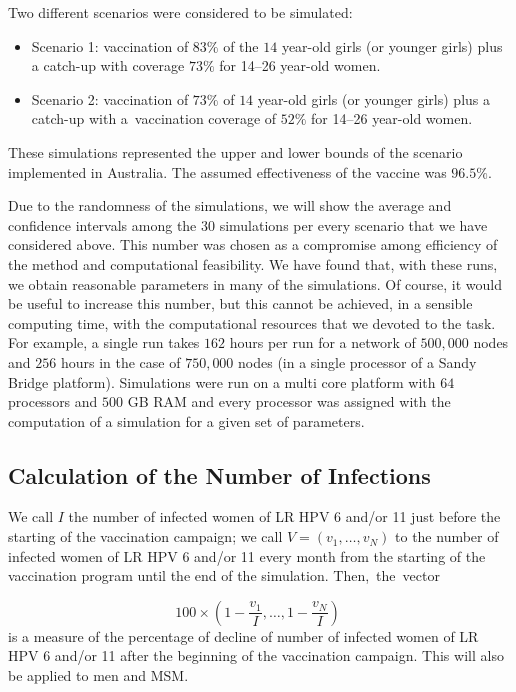 Two different scenarios were considered to be simulated:

\begin{itemize}[leftmargin=*,labelsep=5mm]
\item Scenario 1: vaccination of $83\%$ of the $14$ year-old girls (or younger girls) plus a catch-up with coverage $73\%$ for 14--26 year-old women.
\item Scenario 2: vaccination of $73\%$ of $14$ year-old girls (or younger girls) plus a catch-up with a~vaccination coverage of $52\%$ for 14--26 year-old women.
\end{itemize}

These simulations represented the upper and lower bounds of the scenario implemented in Australia. The assumed effectiveness of the vaccine was $96.5\%$.

Due to the randomness of the simulations, we will show the average and confidence intervals among the $30$ simulations per every scenario that we have considered above. This number was chosen as a compromise among efficiency of the method and computational feasibility. We have found that, with these runs, we obtain reasonable parameters in many of the simulations. Of course, it would be useful to increase this number, but this cannot be achieved, in a sensible computing time, with the computational resources that we
devoted to the task. For example, a single run takes $162$ hours per run for a network of {$500,000$} nodes 
and $256$ hours in the case of {$750,000$} nodes
(in a single processor of a Sandy Bridge platform). Simulations were run on a multi core platform with $64$ processors and $500$ GB RAM and every processor was assigned with the computation of a simulation for a given set of parameters.

\subsection{Calculation of the Number of Infections}

We call $I$ the number of infected women of LR HPV 6 and/or 11 just before the starting of the vaccination campaign; we call $V = ( v_1, \ldots, v_N)$ to the number of infected women of LR HPV 6 and/or 11 every month from the starting of the vaccination program until the end of the simulation. Then,~the~vector 

\begin{equation}
100 \times \left( 1-\displaystyle\frac{v_1}{I}, \ldots, 1-\displaystyle\frac{v_N}{I} \right) \; 
\end{equation}
is a measure of the percentage of decline of number of infected women of LR HPV 6 and/or 11 after the beginning of the vaccination campaign. This will also be applied to men and MSM.

